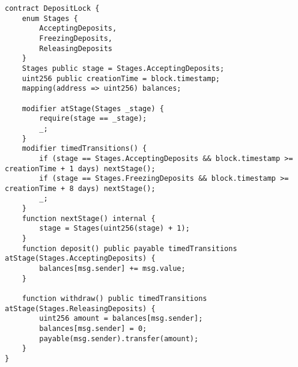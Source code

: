{{\label{appendix:state_machine}\begin{lstlisting}[language=Solidity, caption={Codice di riferimento per State Machine}]
contract DepositLock {
	enum Stages {
		AcceptingDeposits,
		FreezingDeposits,
		ReleasingDeposits
	}
	Stages public stage = Stages.AcceptingDeposits;
	uint256 public creationTime = block.timestamp;
	mapping(address => uint256) balances;
	
	modifier atStage(Stages _stage) {
		require(stage == _stage);
		_;
	}
	modifier timedTransitions() {
		if (stage == Stages.AcceptingDeposits && block.timestamp >= creationTime + 1 days) nextStage();
		if (stage == Stages.FreezingDeposits && block.timestamp >= creationTime + 8 days) nextStage();
		_;
	}
	function nextStage() internal {
		stage = Stages(uint256(stage) + 1);
	}
	function deposit() public payable timedTransitions atStage(Stages.AcceptingDeposits) {
		balances[msg.sender] += msg.value;
	}
	
	function withdraw() public timedTransitions atStage(Stages.ReleasingDeposits) {
		uint256 amount = balances[msg.sender];
		balances[msg.sender] = 0;
		payable(msg.sender).transfer(amount);
	}
}
\end{lstlisting}}}
\newpage
